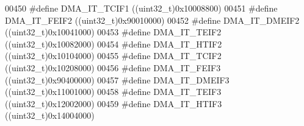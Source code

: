 \begin{DoxyCode}
00450 \textcolor{preprocessor}{#}\textcolor{preprocessor}{define} \textcolor{preprocessor}{DMA\_IT\_TCIF1}                      \textcolor{preprocessor}{(}\textcolor{preprocessor}{(}\textcolor{preprocessor}{uint32\_t}\textcolor{preprocessor}{)}0x10008800\textcolor{preprocessor}{)}
00451 \textcolor{preprocessor}{#}\textcolor{preprocessor}{define} \textcolor{preprocessor}{DMA\_IT\_FEIF2}                      \textcolor{preprocessor}{(}\textcolor{preprocessor}{(}\textcolor{preprocessor}{uint32\_t}\textcolor{preprocessor}{)}0x90010000\textcolor{preprocessor}{)}
00452 \textcolor{preprocessor}{#}\textcolor{preprocessor}{define} \textcolor{preprocessor}{DMA\_IT\_DMEIF2}                     \textcolor{preprocessor}{(}\textcolor{preprocessor}{(}\textcolor{preprocessor}{uint32\_t}\textcolor{preprocessor}{)}0x10041000\textcolor{preprocessor}{)}
00453 \textcolor{preprocessor}{#}\textcolor{preprocessor}{define} \textcolor{preprocessor}{DMA\_IT\_TEIF2}                      \textcolor{preprocessor}{(}\textcolor{preprocessor}{(}\textcolor{preprocessor}{uint32\_t}\textcolor{preprocessor}{)}0x10082000\textcolor{preprocessor}{)}
00454 \textcolor{preprocessor}{#}\textcolor{preprocessor}{define} \textcolor{preprocessor}{DMA\_IT\_HTIF2}                      \textcolor{preprocessor}{(}\textcolor{preprocessor}{(}\textcolor{preprocessor}{uint32\_t}\textcolor{preprocessor}{)}0x10104000\textcolor{preprocessor}{)}
00455 \textcolor{preprocessor}{#}\textcolor{preprocessor}{define} \textcolor{preprocessor}{DMA\_IT\_TCIF2}                      \textcolor{preprocessor}{(}\textcolor{preprocessor}{(}\textcolor{preprocessor}{uint32\_t}\textcolor{preprocessor}{)}0x10208000\textcolor{preprocessor}{)}
00456 \textcolor{preprocessor}{#}\textcolor{preprocessor}{define} \textcolor{preprocessor}{DMA\_IT\_FEIF3}                      \textcolor{preprocessor}{(}\textcolor{preprocessor}{(}\textcolor{preprocessor}{uint32\_t}\textcolor{preprocessor}{)}0x90400000\textcolor{preprocessor}{)}
00457 \textcolor{preprocessor}{#}\textcolor{preprocessor}{define} \textcolor{preprocessor}{DMA\_IT\_DMEIF3}                     \textcolor{preprocessor}{(}\textcolor{preprocessor}{(}\textcolor{preprocessor}{uint32\_t}\textcolor{preprocessor}{)}0x11001000\textcolor{preprocessor}{)}
00458 \textcolor{preprocessor}{#}\textcolor{preprocessor}{define} \textcolor{preprocessor}{DMA\_IT\_TEIF3}                      \textcolor{preprocessor}{(}\textcolor{preprocessor}{(}\textcolor{preprocessor}{uint32\_t}\textcolor{preprocessor}{)}0x12002000\textcolor{preprocessor}{)}
00459 \textcolor{preprocessor}{#}\textcolor{preprocessor}{define} \textcolor{preprocessor}{DMA\_IT\_HTIF3}                      \textcolor{preprocessor}{(}\textcolor{preprocessor}{(}\textcolor{preprocessor}{uint32\_t}\textcolor{preprocessor}{)}0x14004000\textcolor{preprocessor}{)}

\end{DoxyCode}
